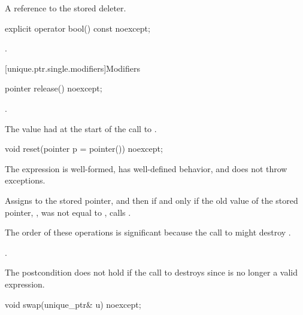 \begin{itemdescr}
\pnum
\returns
A reference to the stored deleter.
\end{itemdescr}

%
\begin{itemdecl}
explicit operator bool() const noexcept;
\end{itemdecl}

\begin{itemdescr}
\pnum
\returns
{}.
\end{itemdescr}

[unique.ptr.single.modifiers]{Modifiers}

%
\begin{itemdecl}
pointer release() noexcept;
\end{itemdecl}

\begin{itemdescr}
\pnum
\ensures
{}.

\pnum
\returns
The value  had at the start of
the call to .
\end{itemdescr}

%
\begin{itemdecl}
void reset(pointer p = pointer()) noexcept;
\end{itemdecl}

\begin{itemdescr}
\pnum
\expects
The expression  is well-formed,
has well-defined behavior, and does not throw exceptions.

\pnum
\effects
Assigns  to the stored pointer, and then if and only if the old value of the
stored pointer, , was not equal to , calls
.
\begin{note}
The order of these operations is significant
because the call to  might destroy .
\end{note}

\pnum
\ensures
{}.
\begin{note}
The postcondition does not hold if the call to 
destroys  since  is no longer a valid expression.
\end{note}
\end{itemdescr}

%
\begin{itemdecl}
void swap(unique_ptr& u) noexcept;
\end{itemdecl}

